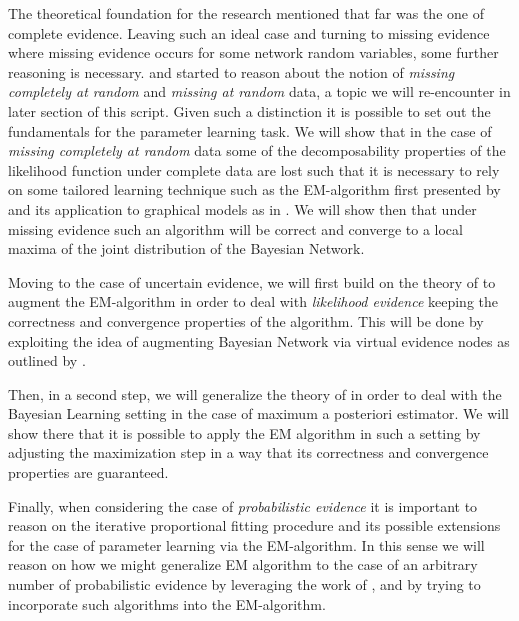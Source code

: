 \documentclass[11pt]{article}
\begin{document}
\begin{article}
The theoretical foundation for the research mentioned that far was
the one of complete evidence. Leaving such an ideal case and
turning to missing evidence where missing evidence occurs for some
network random variables, some further reasoning is
necessary. \cite{rubin1976inference} and \cite{little1976inference}
started to reason about the notion of \emph{missing completely at
random} and \emph{missing at random} data, a topic we will re-encounter
in later section of this script. Given such a distinction it is
possible to set out the fundamentals for the parameter learning
task. We will show that in the case of \emph{missing completely at
random} data some of the decomposability properties of the
likelihood function under complete data are lost such that it is
necessary to rely on some tailored learning technique such as the
EM-algorithm first presented by \cite{dempster1977maximum} and its
application to graphical models as in \cite{lauritzen1995algorithm}.
We will show then that under missing evidence such an algorithm
will be correct and converge to a local maxima of the joint
distribution of the Bayesian Network.

Moving to the case of uncertain evidence, we will first build on
the theory of \cite{Wasserkrug_all} to augment the EM-algorithm in
order to deal with \emph{likelihood evidence} keeping the correctness
and convergence properties of the algorithm. This will be done by
exploiting the idea of augmenting Bayesian Network via virtual
evidence nodes as outlined by \cite{pearl2014probabilistic}.

Then, in a second step, we will generalize the theory of
\cite{Wasserkrug_all} in order to deal with the Bayesian Learning
setting in the case of maximum a posteriori estimator. We will show
there that it is possible to apply the EM algorithm in such a
setting by adjusting the maximization step in a way that its
correctness and convergence properties are guaranteed.

Finally, when considering the case of \emph{probabilistic evidence}
it is important to reason on the iterative proportional fitting
procedure and its possible extensions for the case of parameter
learning via the EM-algorithm. In this sense we will reason on how
we might generalize EM algorithm to the case of an arbitrary number
of probabilistic evidence by leveraging the work of \cite{PENG_2010},
\cite{meng2016method} and by trying to incorporate such algorithms
into the EM-algorithm.


\end{article}
\end{document}
